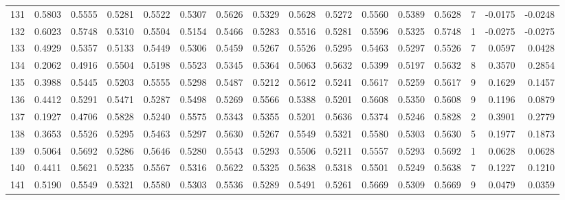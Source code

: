 \begin{tabular}{lrrrrrrrrrrrrrrr}
131 &      0.5803 &  0.5555 &  0.5281 &  0.5522 &  0.5307 &  0.5626 &  0.5329 &  0.5628 &  0.5272 &  0.5560 &   0.5389 &     0.5628 &      7 &                   -0.0175 &                    -0.0248 \\
132 &      0.6023 &  0.5748 &  0.5310 &  0.5504 &  0.5154 &  0.5466 &  0.5283 &  0.5516 &  0.5281 &  0.5596 &   0.5325 &     0.5748 &      1 &                   -0.0275 &                    -0.0275 \\
133 &      0.4929 &  0.5357 &  0.5133 &  0.5449 &  0.5306 &  0.5459 &  0.5267 &  0.5526 &  0.5295 &  0.5463 &   0.5297 &     0.5526 &      7 &                    0.0597 &                     0.0428 \\
134 &      0.2062 &  0.4916 &  0.5504 &  0.5198 &  0.5523 &  0.5345 &  0.5364 &  0.5063 &  0.5632 &  0.5399 &   0.5197 &     0.5632 &      8 &                    0.3570 &                     0.2854 \\
135 &      0.3988 &  0.5445 &  0.5203 &  0.5555 &  0.5298 &  0.5487 &  0.5212 &  0.5612 &  0.5241 &  0.5617 &   0.5259 &     0.5617 &      9 &                    0.1629 &                     0.1457 \\
136 &      0.4412 &  0.5291 &  0.5471 &  0.5287 &  0.5498 &  0.5269 &  0.5566 &  0.5388 &  0.5201 &  0.5608 &   0.5350 &     0.5608 &      9 &                    0.1196 &                     0.0879 \\
137 &      0.1927 &  0.4706 &  0.5828 &  0.5240 &  0.5575 &  0.5343 &  0.5355 &  0.5201 &  0.5636 &  0.5374 &   0.5246 &     0.5828 &      2 &                    0.3901 &                     0.2779 \\
138 &      0.3653 &  0.5526 &  0.5295 &  0.5463 &  0.5297 &  0.5630 &  0.5267 &  0.5549 &  0.5321 &  0.5580 &   0.5303 &     0.5630 &      5 &                    0.1977 &                     0.1873 \\
139 &      0.5064 &  0.5692 &  0.5286 &  0.5646 &  0.5280 &  0.5543 &  0.5293 &  0.5506 &  0.5211 &  0.5557 &   0.5293 &     0.5692 &      1 &                    0.0628 &                     0.0628 \\
140 &      0.4411 &  0.5621 &  0.5235 &  0.5567 &  0.5316 &  0.5622 &  0.5325 &  0.5638 &  0.5318 &  0.5501 &   0.5249 &     0.5638 &      7 &                    0.1227 &                     0.1210 \\
141 &      0.5190 &  0.5549 &  0.5321 &  0.5580 &  0.5303 &  0.5536 &  0.5289 &  0.5491 &  0.5261 &  0.5669 &   0.5309 &     0.5669 &      9 &                    0.0479 &                     0.0359 \\

\end{tabular}
